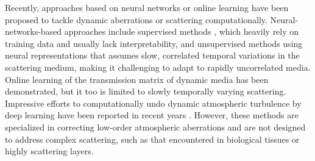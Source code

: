 \documentclass[pdflatex,sn-mathphys-num]{sn-jnl}%
\theoremstyle{thmstyleone}%
\theoremstyle{thmstyletwo}%
\theoremstyle{thmstylethree}%
\begin{document}
Recently, approaches based on neural networks or online learning have been proposed to tackle dynamic aberrations or scattering computationally. Neural-networks-based approaches include supervised methods \cite{sun2019image,liu2024learning}, which heavily rely on training data and usually lack interpretability, and unsupervised methods using neural representations \cite{feng23,xie2024wavemo} 
that assumes slow, correlated temporal variations in the scattering medium, making it challenging to adapt to rapidly uncorrelated media. 
Online learning of the transmission matrix of dynamic media \cite{valzania2023online} has been demonstrated, but it too is limited to slowly temporally varying scattering. 
Impressive efforts to computationally undo dynamic atmospheric turbulence by deep learning have been reported in recent years \cite{mao2022single,jiang2023nert,cai2023convrt,zhang2024imaging, zhang2024spatio}. However, these methods are specialized in correcting low-order atmospheric aberrations and are not designed to address complex scattering, such as that encountered in biological tissues or highly scattering layers.

\end{document}

